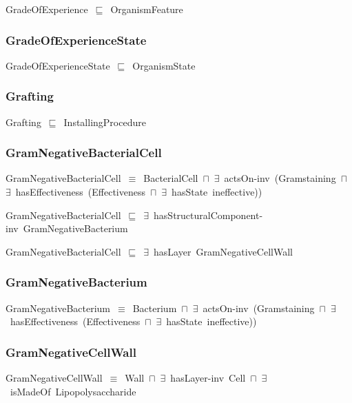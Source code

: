 \documentclass{article}
\begin{document}
GradeOfExperience~\ensuremath{\sqsubseteq}~OrganismFeature~

\subsubsection*{GradeOfExperienceState}

GradeOfExperienceState~\ensuremath{\sqsubseteq}~OrganismState~

\subsubsection*{Grafting}

Grafting~\ensuremath{\sqsubseteq}~InstallingProcedure~

\subsubsection*{GramNegativeBacterialCell}

GramNegativeBacterialCell~\ensuremath{\equiv}~BacterialCell~\ensuremath{\sqcap}~\ensuremath{\exists}~actsOn-inv~(Gramstaining~\ensuremath{\sqcap}~\ensuremath{\exists}~hasEffectiveness~(Effectiveness~\ensuremath{\sqcap}~\ensuremath{\exists}~hasState~ineffective))

GramNegativeBacterialCell~\ensuremath{\sqsubseteq}~\ensuremath{\exists}~hasStructuralComponent-inv~GramNegativeBacterium~

GramNegativeBacterialCell~\ensuremath{\sqsubseteq}~\ensuremath{\exists}~hasLayer~GramNegativeCellWall~

\subsubsection*{GramNegativeBacterium}

GramNegativeBacterium~\ensuremath{\equiv}~Bacterium~\ensuremath{\sqcap}~\ensuremath{\exists}~actsOn-inv~(Gramstaining~\ensuremath{\sqcap}~\ensuremath{\exists}~hasEffectiveness~(Effectiveness~\ensuremath{\sqcap}~\ensuremath{\exists}~hasState~ineffective))

\subsubsection*{GramNegativeCellWall}

GramNegativeCellWall~\ensuremath{\equiv}~Wall~\ensuremath{\sqcap}~\ensuremath{\exists}~hasLayer-inv~Cell~\ensuremath{\sqcap}~\ensuremath{\exists}~isMadeOf~Lipopolysaccharide
\end{document}
